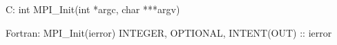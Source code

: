 C:
int MPI_Init(int *argc, char ***argv)

Fortran:
MPI_Init(ierror)
INTEGER, OPTIONAL, INTENT(OUT) :: ierror
